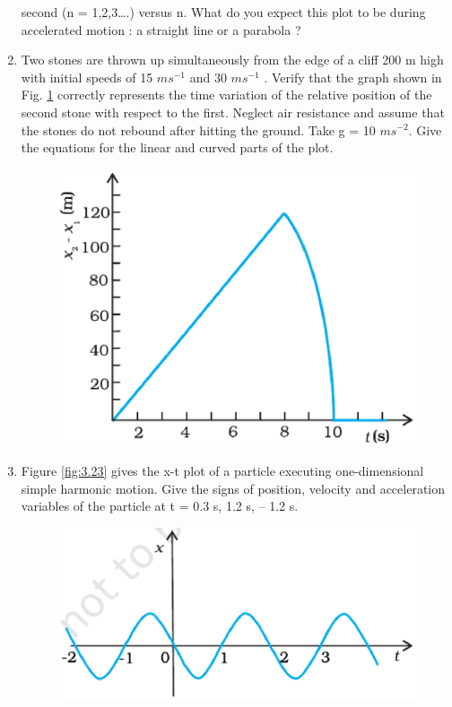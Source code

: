 \begin{enumerate}[label=\arabic*.,ref=\thesubsection.\theenumi]
second (n = 1,2,3….) versus n. What do you expect this plot to be during accelerated motion : a straight line or a parabola ?
%
\item Two stones are thrown up simultaneously from the edge of a cliff 200 m high with initial speeds of 15 $m s^{-1}$
and 30 $m s^{-1}$ . Verify that the graph shown in Fig. \ref{fig:3.27}
correctly represents the time variation of the relative position of the second stone with respect to the first. Neglect air resistance and assume that the stones do not rebound after hitting the ground. Take g = 10 $m s^{-2}$. Give the equations for the linear and curved parts of the plot.
%
\begin{figure}[!ht]
\centering
\includegraphics[width=\columnwidth]{./curves/figs/11-1-3/3.27.eps}
\caption{}
\label{fig:3.27}
\end{figure}
%
\item Figure \ref{fig:3.23} gives the x-t plot of a particle executing one-dimensional simple harmonic motion. Give the signs of position, velocity and acceleration variables of the particle at t = 0.3 s, 1.2 s, – 1.2 s.
%
\begin{figure}[!ht]
\centering
\includegraphics[width=\columnwidth]{./curves/figs/11-1-3/3.23.eps}

\end{figure}
\end{enumerate}
